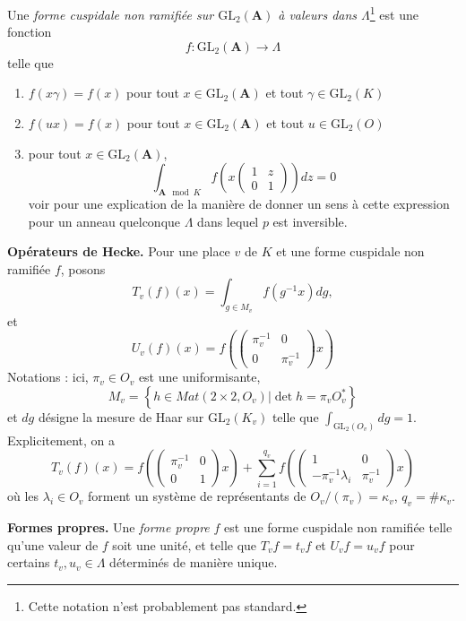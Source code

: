 \begin{definition}
\label{definition-unramified}
Une {\it forme cuspidale non ramifiée sur $\text{GL}_2(\mathbf{A})$ à valeurs dans
$\Lambda$}\footnote{Cette notation n'est probablement pas standard.}
est une fonction
$$
f : \text{GL}_2(\mathbf{A}) \to \Lambda
$$
telle que
\begin{enumerate}
\item $f(x\gamma) = f(x)$ pour tout $x\in \text{GL}_2(\mathbf{A})$ et tout
$\gamma\in \text{GL}_2(K)$
\item $f(ux) = f(x)$ pour tout $x\in \text{GL}_2(\mathbf{A})$ et tout
$u\in \text{GL}_2(O)$
\item pour tout $x\in \text{GL}_2(\mathbf{A})$,
$$
\int_{\mathbf{A} \mod K} f
\left(x
\left(
\begin{matrix}
1 & z \\
0 & 1
\end{matrix}
\right)
\right) dz = 0
$$
voir \cite[Section 4.1]{dJ-conjecture}
pour une explication de la manière de donner un sens à cette expression
pour un anneau quelconque $\Lambda$ dans lequel $p$ est inversible.
\end{enumerate}
\end{definition}

\noindent
{\bf Opérateurs de Hecke.}
Pour une place $v$ de $K$ et une forme cuspidale non ramifiée $f$, posons
$$
T_v(f)(x) =
\int_{g\in M_v}f(g^{-1}x)dg,
$$
et
$$
U_v(f)(x) =
f\left(
\left(
\begin{matrix}
\pi_v^{-1} & 0 \\
0 & \pi_v^{-1}
\end{matrix}
\right)x\right)
$$
Notations : ici, $\pi_v \in O_v$ est une uniformisante,
$$
M_v =
\left\{
h\in Mat(2\times 2, O_v) | \det h = \pi_vO_v^*\right\}
$$
et $dg$ désigne la mesure de Haar sur $\text{GL}_2(K_v)$ telle que
$\int_{\text{GL}_2(O_v)} dg = 1$. Explicitement, on a
$$
T_v(f)(x) =
f\left(
\left(
\begin{matrix}
\pi_v^{-1}& 0 \\
0 & 1
\end{matrix}
\right)
x\right) +
\sum_{i = 1}^{q_v}
f\left(\left(
\begin{matrix}
1 & 0 \\
-\pi_v^{-1}\lambda_i
& \pi_v^{-1}
\end{matrix}
\right) x\right)
$$
où les $\lambda_i\in O_v$ forment un système de représentants de
$O_v/(\pi_v)=\kappa_v$, $q_v = \#\kappa_v$.

\medskip\noindent
{\bf Formes propres.} Une {\it forme propre} $f$ est une forme cuspidale non ramifiée
telle qu'une valeur de $f$ soit une unité, et telle que $T_vf = t_vf$ et
$U_vf = u_vf$ pour certains $t_v, u_v \in \Lambda$ déterminés de manière unique.


